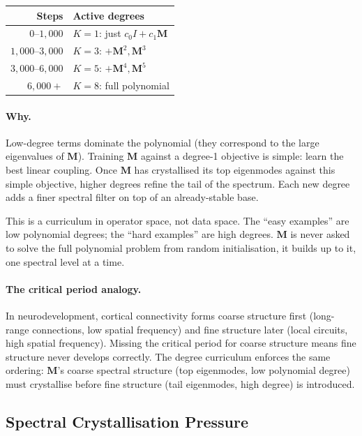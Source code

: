 \documentclass[11pt, a4paper]{article}
\newcommand{\M}{\mathbf{M}}
\theoremstyle{plain}
\theoremstyle{definition}
\theoremstyle{remark}
\begin{document}
\begin{center}\small
\begin{tabular}{rl}
\toprule
\textbf{Steps} & \textbf{Active degrees} \\
\midrule
$0$--$1{,}000$ & $K = 1$: just $c_0 I + c_1 \M$ \\
$1{,}000$--$3{,}000$ & $K = 3$: $+ \M^2, \M^3$ \\
$3{,}000$--$6{,}000$ & $K = 5$: $+ \M^4, \M^5$ \\
$6{,}000+$ & $K = 8$: full polynomial \\
\bottomrule
\end{tabular}
\end{center}

\paragraph{Why.}
Low-degree terms dominate the polynomial (they correspond to the large eigenvalues of $\M$).
Training $\M$ against a degree-1 objective is simple: learn the best linear coupling.
Once $\M$ has crystallised its top eigenmodes against this simple objective, higher degrees refine the tail of the spectrum.
Each new degree adds a finer spectral filter on top of an already-stable base.

This is a curriculum in operator space, not data space.
The ``easy examples'' are low polynomial degrees; the ``hard examples'' are high degrees.
$\M$ is never asked to solve the full polynomial problem from random initialisation, it builds up to it, one spectral level at a time.

\paragraph{The critical period analogy.}
In neurodevelopment, cortical connectivity forms coarse structure first (long-range connections, low spatial frequency) and fine structure later (local circuits, high spatial frequency).
Missing the critical period for coarse structure means fine structure never develops correctly.
The degree curriculum enforces the same ordering: $\M$'s coarse spectral structure (top eigenmodes, low polynomial degree) must crystallise before fine structure (tail eigenmodes, high degree) is introduced.

\subsection{Spectral Crystallisation Pressure}
\end{document}
